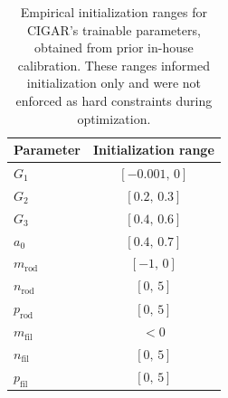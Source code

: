 \begin{table}[H]
    \centering
    \caption{Empirical initialization ranges for CIGAR's trainable
    parameters, obtained from prior in-house calibration. These ranges
    informed initialization only and were not enforced as hard constraints
    during optimization.}
    \label{tab:init_ranges}
    \footnotesize
    \begin{tabular}{l c}
        \toprule
        Parameter & Initialization range \\
        \midrule
        $G_1$              & $[-0.001,\,0]$ \\
        $G_2$              & $[0.2,\,0.3]$ \\
        $G_3$              & $[0.4,\,0.6]$ \\
        $a_0$              & $[0.4,\,0.7]$ \\
        $m_{\mathrm{rod}}$ & $[-1,\,0]$ \\
        $n_{\mathrm{rod}}$ & $[0,\,5]$ \\
        $p_{\mathrm{rod}}$ & $[0,\,5]$ \\
        $m_{\mathrm{fil}}$ & $<0$ \\
        $n_{\mathrm{fil}}$ & $[0,\,5]$ \\
        $p_{\mathrm{fil}}$ & $[0,\,5]$ \\
        \bottomrule
    \end{tabular}
\end{table}
